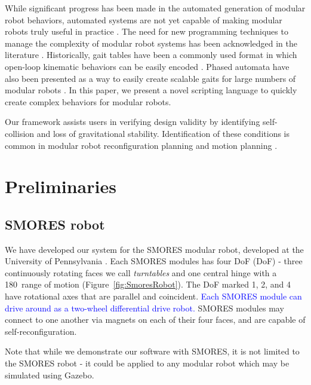 \documentclass[conference]{IEEEtran}
\theoremstyle{definition}
\newcommand{\changedByJim}[1]{\textcolor{blue}{#1}}
\begin{document}
While significant progress has been made in the automated generation of modular robot behaviors,
automated systems are not yet capable of making modular robots truly useful in practice
\cite{yim2007modular}.  The need for new programming techniques to manage the complexity
of modular robot systems has been acknowledged in the literature \cite{yim2000modular}.
Historically, gait tables have been a commonly used format in which open-loop kinematic
behaviors can be easily encoded \cite{yim1994locomotion}. Phased automata have also
been presented as a way to easily create scalable gaits for large numbers of modular
robots \cite{zhang2003phase}. In this paper, we present a novel scripting language
to quickly create complex behaviors for modular robots.

Our framework assists users in verifying design validity by identifying self-collision
and loss of gravitational stability. Identification of these conditions is common
in modular robot reconfiguration planning \cite{casal2001reconfiguration} and motion
planning \cite{yoshida2002self}.

\section{Preliminaries}
\label{sec:preliminaries}
\subsection{SMORES robot}
We have developed our system for the SMORES modular robot, developed at the
University of Pennsylvania \cite{Davey2012}. Each SMORES modules has four DoF
(DoF) - three continuously rotating faces we call {\em turntables} and one
central hinge with a 180\textdegree\ range of motion (Figure~\ref{fig:SmoresRobot}). The
DoF marked 1, 2, and 4 have rotational axes that are parallel and coincident. \changedByJim{Each SMORES module can drive around as a two-wheel differential drive robot.}
SMORES modules may connect to one another via magnets on each of their four
faces, and are capable of  self-reconfiguration.

Note that while we demonstrate our software with SMORES, it is not limited to the SMORES robot - it could be applied to any modular robot which may be simulated using Gazebo.
\end{document}
